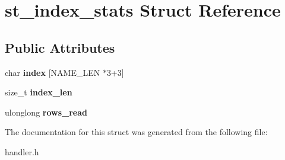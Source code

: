 \hypertarget{structst__index__stats}{}\section{st\+\_\+index\+\_\+stats Struct Reference}
\label{structst__index__stats}
\subsection*{Public Attributes}
\begin{DoxyCompactItemize}
\item 
\mbox{\label{structst__index__stats_ae2ab133083e01906c3276ab135fba61a}} 
char {\bfseries index} \mbox{[}N\+A\+M\+E\+\_\+\+L\+EN $\ast$3+3\mbox{]}
\item 
\mbox{\label{structst__index__stats_ac3780ab3758bd84f98454a7a6f5ff7d0}} 
size\+\_\+t {\bfseries index\+\_\+len}
\item 
\mbox{\label{structst__index__stats_a1c11fe52bec547760d14f449de28c117}} 
ulonglong {\bfseries rows\+\_\+read}
\end{DoxyCompactItemize}


The documentation for this struct was generated from the following file\+:\begin{DoxyCompactItemize}
\item 
handler.\+h\end{DoxyCompactItemize}

